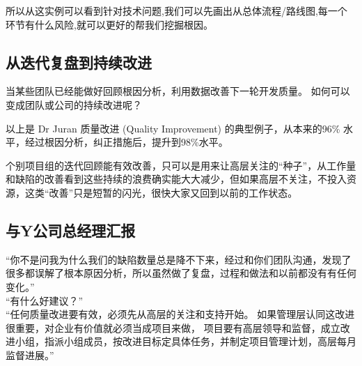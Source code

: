 所以从这实例可以看到针对技术问题,我们可以先画出从总体流程/路线图,每一个环节有什么风险,就可以更好的帮我们挖掘根因。

\hypertarget{ux4eceux8fedux4ee3ux590dux76d8ux5230ux6301ux7eedux6539ux8fdb}{%
\subsection{从迭代复盘到持续改进}\label{ux4eceux8fedux4ee3ux590dux76d8ux5230ux6301ux7eedux6539ux8fdb}}

当某些团队已经能做好回顾根因分析，利用数据改善下一轮开发质量。
如何可以变成团队或公司的持续改进呢？


以上是 Dr Juran 质量改进 (Quality Improvement) 的典型例子，从本来的96\%
水平，经过根因分析，纠正措施后，提升到98\%水平。

个别项目组的迭代回顾能有效改善，只可以是用来让高层关注的``种子''，从工作量和缺陷的改善看到这些持续的浪费确实能大大减少，但如果高层不关注，不投入资源，这类``改善''只是短暂的闪光，很快大家又回到以前的工作状态。

\hypertarget{ux4e0eyux516cux53f8ux603bux7ecfux7406ux6c47ux62a5}{%
\subsection{与Y公司总经理汇报}\label{ux4e0eyux516cux53f8ux603bux7ecfux7406ux6c47ux62a5}}

``你不是问我为什么我们的缺陷数量总是降不下来，经过和你们团队沟通，发现了很多都误解了根本原因分析，所以虽然做了复盘，过程和做法和以前都没有有任何变化。''\\
``有什么好建议？''\\
``任何质量改进要有效，必须先从高层的关注和支持开始。
如果管理层认同这改进很重要，对企业有价值就必须当成项目来做，
项目要有高层领导和监督，成立改进小组，指派小组成员，按改进目标定具体任务，并制定项目管理计划，高层每月监督进展。''

